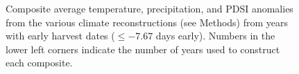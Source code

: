 \documentclass[final]{nature}
\begin{document}
\begin{figure}
\caption{Composite average temperature, precipitation, and PDSI anomalies from the various climate reconstructions (see Methods) from years with early harvest dates ($\le-7.67$ days early). Numbers in the lower left corners indicate the number of years used to construct each composite.}
\end{figure}


\end{document}
